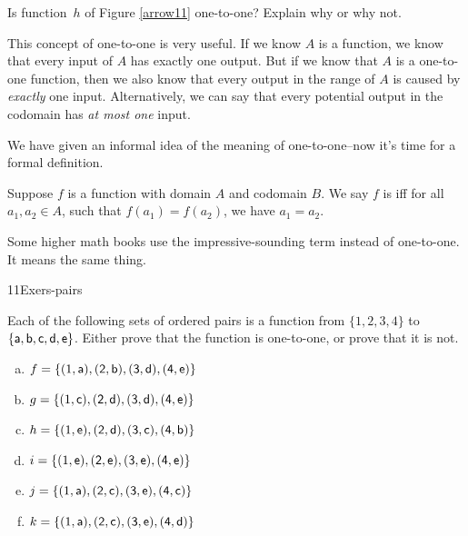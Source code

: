 \begin{exercise}{}
Is function~$h$ of Figure \ref{arrow11} one-to-one?  Explain why or why not.
\end{exercise}

This concept of one-to-one is very useful.  If we know $A$ is a function, we know that every input of $A$ has exactly one output.  But if we know that $A$ is a one-to-one function, then we also know that every output in the range of $A$ is caused by \emph{exactly} one input.  Alternatively, we can say that every potential output in the codomain has \emph{at most one} input.

We have given an informal idea of the meaning of one-to-one--now it's time for a formal definition.

\begin{defn} \label{121defn}
Suppose $f$ is a function with domain $A$ and codomain $B$. We say $f$ is   iff for all $a_1,a_2 \in A$, such that
$f(a_1) = f(a_2)$, we have $a_1 = a_2$. 
\end{defn}
Some higher math books use the impressive-sounding term  instead of one-to-one. It means the same thing.


\begin{exercise}{11Exers-pairs}
 
 Each of the following sets of ordered pairs is a function from $\{1,2,3,4\}$ to $\{\sf{a},\sf{b},\sf{c},\sf{d},\sf{e}\}$. Either prove that the function is one-to-one, or prove that it is not.
\begin{multicols}{2}
\begin{enumerate}[(a)]
\item  \label{11Exers-pairs-f}
$f = \{ (1,\sf{a}), (2,\sf{b}), (3,\sf{d}), (4,\sf{e})\}$
\item  \label{11Exers-pairs-g}
$g = \{ (1,\sf{c}), (2,\sf{d}), (3,\sf{d}), (4,\sf{e})\}$
\item  \label{11Exers-pairs-h}
$h = \{ (1,\sf{e}), (2,\sf{d}), (3,\sf{c}), (4,\sf{b})\}$
\item  \label{11Exers-pairs-i}
$i = \{ (1,\sf{e}), (2,\sf{e}), (3,\sf{e}), (4,\sf{e})\}$
\item  \label{11Exers-pairs-j}
$j = \{ (1,\sf{a}), (2,\sf{c}), (3,\sf{e}), (4,\sf{c})\}$
\item  \label{11Exers-pairs-k}
$k = \{ (1,\sf{a}), (2,\sf{c}), (3,\sf{e}), (4,\sf{d})\}$
\end{enumerate}
\end{multicols}
\end{exercise}

